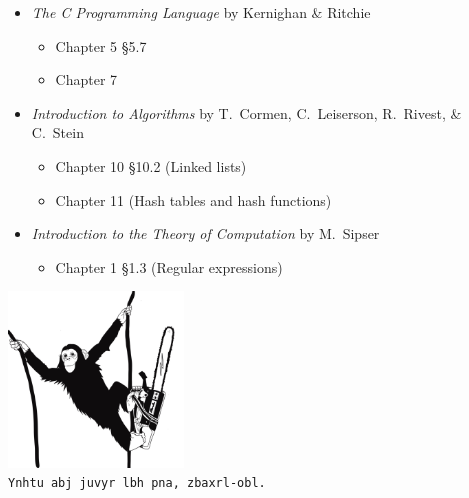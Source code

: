 \documentclass{article}
\begin{document}
\begin{itemize}
  \item \textit{The C Programming Language} by Kernighan \& Ritchie
  \begin{itemize}
    \item Chapter 5 \S 5.7
    \item Chapter 7
  \end{itemize}
  \item \textit{Introduction to Algorithms} by T.\ Cormen, C.\
    Leiserson, R.\ Rivest, \& C.\ Stein
    \begin{itemize}
      \item Chapter 10 \S 10.2 (Linked lists)
      \item Chapter 11 (Hash tables and hash functions)
    \end{itemize}
  \item \textit{Introduction to the Theory of Computation} by M.\ Sipser
    \begin{itemize}
      \item Chapter 1 \S 1.3 (Regular expressions)
    \end{itemize}
\end{itemize}

\begin{center}
  \includegraphics[width=0.35\textwidth]{../../images/monkey-chainsaw.jpg} \\
  \vspace{10pt}
  \texttt{Ynhtu abj juvyr lbh pna, zbaxrl-obl.}
\end{center}
\end{document}
